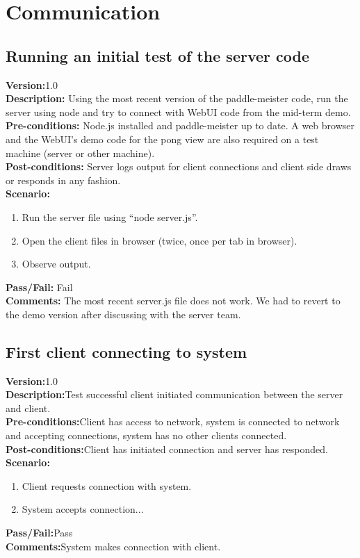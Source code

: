 \documentclass[12pt]{article}
\begin{document}
\newpage

\section{Communication}
\label{sec:communicationCases}

    \subsection{Running an initial test of the server code}
    \label{sec:initialTest}
    \textbf{Version:}1.0\\
    \textbf{Description:} Using the most recent version of the paddle-meister code, run the server using node and try to connect with WebUI code from the mid-term demo.\\
    \textbf{Pre-conditions:} Node.js installed and paddle-meister up to date.  A web browser and the WebUI’s demo code for the pong view are also required on a test machine (server or other machine).\\
    \textbf{Post-conditions:} Server logs output for client connections and client side draws or responds in any fashion.\\
    \textbf{Scenario:}
    \begin{enumerate}
        \item Run the server file using “node server.js”.
        \item Open the client files in browser (twice, once per tab in browser).
        \item Observe output.
    \end{enumerate}
    \textbf{Pass/Fail:} Fail\\
    \textbf{Comments:} The most recent server.js file does not work.  We had to revert to the demo version after discussing with the server team.\\

    \subsection{First client connecting to system}
    \textbf{Version:}1.0\\
    \textbf{Description:}Test successful client initiated communication between the server and client.\\
    \textbf{Pre-conditions:}Client has access to network, system is connected to network and accepting connections, system has no other clients connected.\\
    \textbf{Post-conditions:}Client has initiated connection and server has responded.\\
    \textbf{Scenario:}
    \begin{enumerate}
        \item Client requests connection with system.
        \item System accepts connection...
    \end{enumerate}
    \textbf{Pass/Fail:}Pass\\
    \textbf{Comments:}System makes connection with client.\\
\end{document}
